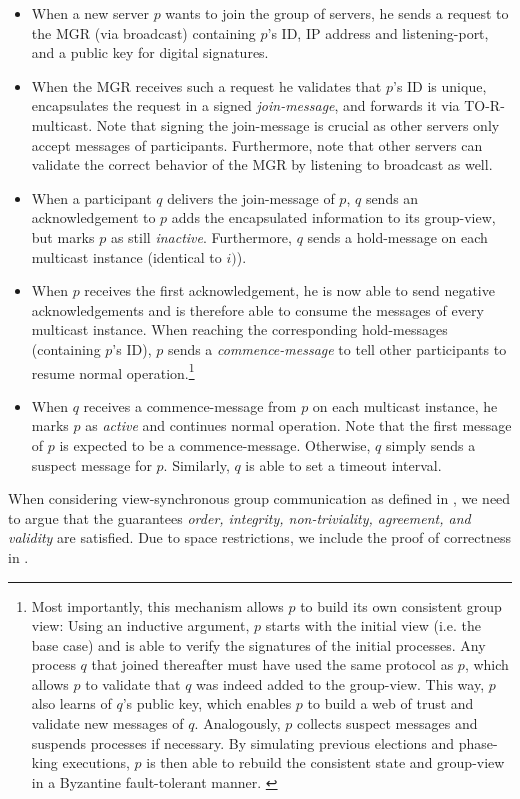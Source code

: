\documentclass[runningheads]{llncs}
\begin{document}
\begin{enumerate}
    \begin{itemize}
        \item When a new server $p$ wants to join the group of servers, he sends a request to the MGR (via broadcast) containing $p$'s ID, IP address and listening-port, and a public key for digital signatures.
        \item When the MGR receives such a request he validates that $p$'s ID is unique, encapsulates the request in a signed \textit{join-message}, and forwards it via TO-R-multicast. Note that signing the join-message is crucial as other servers only accept messages of participants. Furthermore, note that other servers can validate the correct behavior of the MGR by listening to broadcast as well. 
        \item When a participant $q$ delivers the join-message of $p$, $q$ sends an acknowledgement to $p$ adds the encapsulated information to its group-view, but marks $p$ as still \textit{inactive}. Furthermore, $q$ sends a hold-message on each multicast instance (identical to $i)$). 
        \item When $p$ receives the first acknowledgement, he is now able to send negative acknowledgements and is therefore able to consume the messages of every multicast instance. When reaching the corresponding hold-messages (containing $p$'s ID), $p$ sends a \textit{commence-message} to tell other participants to resume normal operation.\footnote{Most importantly, this mechanism allows $p$ to build its own consistent group view: Using an inductive argument, $p$ starts with the initial view (i.e. the base case) and is able to verify the signatures of the initial processes. Any process $q$ that joined thereafter must have used the same protocol as $p$, which allows $p$ to validate that $q$ was indeed added to the group-view. This way, $p$ also learns of $q$'s public key, which enables $p$ to build a web of trust and validate new messages of $q$. Analogously, $p$ collects suspect messages and suspends processes if necessary. By simulating previous elections and phase-king executions, $p$ is then able to rebuild the consistent state and group-view in a Byzantine fault-tolerant manner. \label{footnote:web_of_trust}}
        \item When $q$ receives a commence-message from $p$ on each multicast instance, he marks $p$ as \textit{active} and continues normal operation. Note that the first message of $p$ is expected to be a commence-message. Otherwise, $q$ simply sends a suspect message for $p$. Similarly, $q$ is able to set a timeout interval.
    \end{itemize} 
\end{enumerate}
When considering view-synchronous group communication as defined in \cite[p. ~772-773]{ds_book}, we need to argue that the guarantees \textit{order, integrity, non-triviality, agreement, and validity} are satisfied. Due to space restrictions, we include the proof of correctness in .
\end{document}
